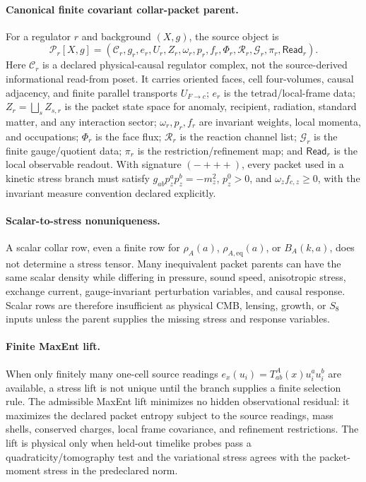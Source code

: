 \paragraph{Canonical finite covariant collar-packet parent.}
For a regulator \(r\) and background \((X,g)\), the source object is
\[
\mathcal P_r[X,g]=
(\mathcal C_r,g_r,e_r,U_r,Z_r,\omega_r,p_r,f_r,\Phi_r,\mathcal R_r,
\mathcal G_r,\pi_r,\mathsf{Read}_r).
\]
Here \(\mathcal C_r\) is a declared physical-causal regulator complex, not the
source-derived informational read-from poset. It carries oriented faces, cell
four-volumes, causal adjacency, and finite parallel transports \(U_{F\to c}\);
\(e_r\) is the tetrad/local-frame data; \(Z_r=\bigsqcup_s Z_{s,r}\) is the
packet state space for anomaly, recipient, radiation, standard matter, and any
interaction sector; \(\omega_r,p_r,f_r\) are invariant weights, local momenta,
and occupations; \(\Phi_r\) is the face flux; \(\mathcal R_r\) is the reaction
channel list; \(\mathcal G_r\) is the finite gauge/quotient data; \(\pi_r\) is
the restriction/refinement map; and \(\mathsf{Read}_r\) is the local observable
readout.  With signature \((-+++)\), every packet used in a kinetic stress
branch must satisfy \(g_{ab}p_z^ap_z^b=-m_z^2\), \(p_z^0>0\), and
\(\omega_z f_{c,z}\ge0\), with the invariant measure convention declared
explicitly.

\paragraph{Scalar-to-stress nonuniqueness.}
A scalar collar row, even a finite row for \(\rho_A(a)\), \(\rho_{A,\mathrm{eq}}(a)\),
or \(B_A(k,a)\), does not determine a stress tensor.  Many inequivalent packet
parents can have the same scalar density while differing in pressure, sound
speed, anisotropic stress, exchange current, gauge-invariant perturbation
variables, and causal response. Scalar rows are therefore insufficient as
physical CMB, lensing, growth, or \(S_8\) inputs unless the parent supplies the
missing stress and response variables.

\paragraph{Finite MaxEnt lift.}
When only finitely many one-cell source readings
\(e_x(u_i)=T^A_{ab}(x)u_i^au_i^b\) are available, a stress lift is not unique
until the branch supplies a finite selection rule.  The admissible MaxEnt lift
minimizes no hidden observational residual: it maximizes the declared packet
entropy subject to the source readings, mass shells, conserved charges, local
frame covariance, and refinement restrictions.  The lift is physical only when
held-out timelike probes pass a quadraticity/tomography test and the
variational stress agrees with the packet-moment stress in the predeclared norm.

